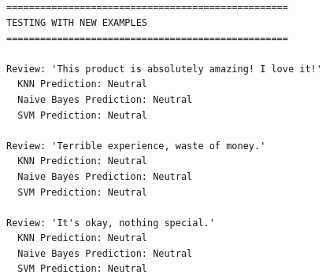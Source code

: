 \documentclass[11pt]{article}
\begin{document}
    \begin{center}
    \end{center}
    { \hspace*{\fill} \\}
    
    \begin{center}
    \end{center}
    { \hspace*{\fill} \\}
    
    \begin{center}
    \end{center}
    { \hspace*{\fill} \\}
    
    \begin{Verbatim}[commandchars=\\\{\}]

==================================================
TESTING WITH NEW EXAMPLES
==================================================

Review: 'This product is absolutely amazing! I love it!'
  KNN Prediction: Neutral
  Naive Bayes Prediction: Neutral
  SVM Prediction: Neutral

Review: 'Terrible experience, waste of money.'
  KNN Prediction: Neutral
  Naive Bayes Prediction: Neutral
  SVM Prediction: Neutral

Review: 'It's okay, nothing special.'
  KNN Prediction: Neutral
  Naive Bayes Prediction: Neutral
  SVM Prediction: Neutral
    \end{Verbatim}


    
    
    
\end{document}
